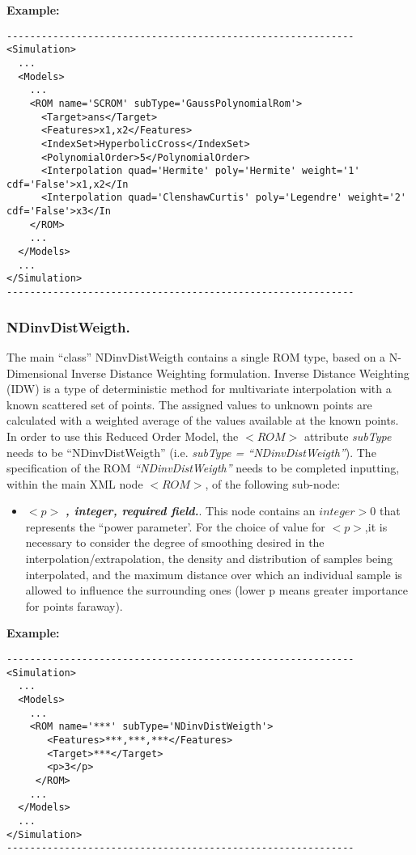 \textbf{Example:}
\begin{lstlisting}[style=XML]
------------------------------------------------------------
<Simulation>
  ...
  <Models>
    ...
    <ROM name='SCROM' subType='GaussPolynomialRom'>
      <Target>ans</Target>
      <Features>x1,x2</Features>
      <IndexSet>HyperbolicCross</IndexSet>
      <PolynomialOrder>5</PolynomialOrder>
      <Interpolation quad='Hermite' poly='Hermite' weight='1' cdf='False'>x1,x2</In
      <Interpolation quad='ClenshawCurtis' poly='Legendre' weight='2' cdf='False'>x3</In
    </ROM>
    ...
  </Models>
  ...
</Simulation>
------------------------------------------------------------
\end{lstlisting}

\subsubsection{NDinvDistWeigth.}
\label{subsubsec:NDinvDistWeigth}
The main ``class'' NDinvDistWeigth contains a single ROM type, based on a N-Dimensional Inverse Distance Weighting formulation. Inverse Distance Weighting (IDW) is a type of deterministic method for multivariate interpolation with a known scattered set of points. The assigned values to unknown points are calculated with a weighted average of the values available at the known points. 
\\In order to use this Reduced Order Model, the $<ROM>$ attribute \textit{subType} needs to be ``NDinvDistWeigth'' (i.e. \textit{subType = ``NDinvDistWeigth''}). The specification of the ROM \textit{``NDinvDistWeigth''} needs to be completed inputting, within the main XML node $<ROM>$, of the following sub-node:
\begin{itemize}
\item $<p>$ \textbf{\textit{, integer, required field.}}. This node contains an $integer > 0$ that represents the ``power parameter'. For the choice of value for $<p>$,it is necessary to consider the degree of smoothing desired in the interpolation/extrapolation, the density and distribution of samples being interpolated, and the maximum distance over which an individual sample is allowed to influence the surrounding ones (lower p means greater importance for points faraway).
\end{itemize}

\textbf{Example:}
\begin{lstlisting}[style=XML]
------------------------------------------------------------
<Simulation>
  ...
  <Models>
    ...
    <ROM name='***' subType='NDinvDistWeigth'>
       <Features>***,***,***</Features> 
       <Target>***</Target>
       <p>3</p>
     </ROM>
    ...
  </Models>
  ...
</Simulation>
------------------------------------------------------------
\end{lstlisting}
